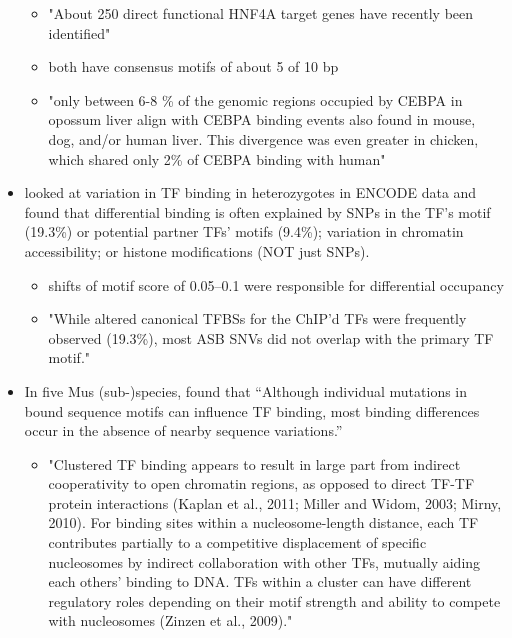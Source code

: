\documentclass{article}
\begin{document}
\begin{itemize}
\begin{itemize}
            \item "About 250 direct functional HNF4A target genes have recently been identified"

            \item both have consensus motifs of about 5 of 10 bp

            \item "only between 6-8 \% of the genomic regions occupied by CEBPA in opossum liver align with CEBPA binding events also found in
                mouse, dog, and/or human liver. This divergence was even greater in chicken, which shared only 2\% of CEBPA binding with human"
        \end{itemize}

    \item \citet{shi2016evaluating} looked at variation in TF binding in heterozygotes in ENCODE data
        and found that differential binding is often explained by SNPs in the TF's motif (19.3\%) or potential partner TFs' motifs (9.4\%);
        variation in chromatin accessibility; or histone modifications (NOT just SNPs).
        \begin{itemize}
            \item shifts of motif score of 0.05--0.1 were responsible for differential occupancy
            \item "While altered canonical TFBSs for the ChIP'd TFs were frequently observed (19.3\%), most ASB SNVs did not overlap with the primary TF motif."
        \end{itemize}

    \item \citet{stefflova2013cooperativity} In five Mus (sub-)species, found that
        ``Although individual mutations in bound sequence motifs can influence TF binding, most binding differences occur in the absence of nearby sequence variations.''
        \begin{itemize}
            \item "Clustered TF binding appears to result in large part
                from indirect cooperativity to open chromatin regions, as opposed
                to direct TF-TF protein interactions (Kaplan et al., 2011; Miller
                and Widom, 2003; Mirny, 2010). For binding sites within a
                nucleosome-length distance, each TF contributes partially to a
                competitive displacement of specific nucleosomes by indirect
                collaboration with other TFs, mutually aiding each others’ binding
                to DNA. TFs within a cluster can have different regulatory roles
                depending on their motif strength and ability to compete with
                nucleosomes (Zinzen et al., 2009)." 
        \end{itemize}


\end{itemize}
\end{document}
